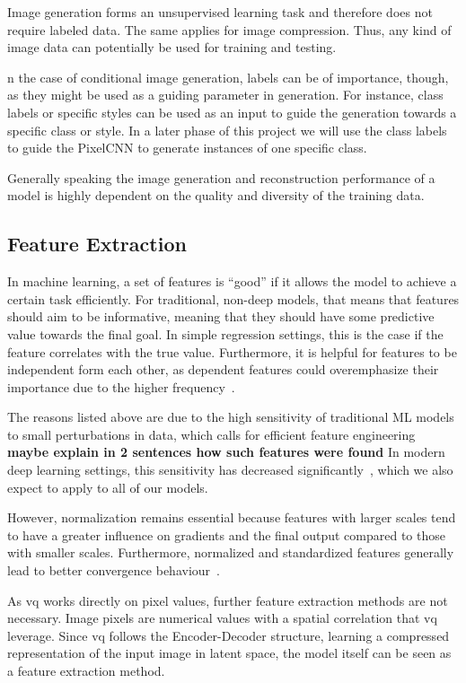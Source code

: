 Image generation forms an unsupervised learning task and therefore does not require labeled data.
The same applies for image compression.
Thus, any kind of image data can potentially be used for training and testing.

n the case of conditional image generation, labels can be of importance, though, as they might be used as a guiding
parameter in generation.
For instance, class labels or specific styles  can be used as an input to guide the generation towards a specific class or style.
In a later phase of this project we will use the class labels to guide the PixelCNN to generate instances of one specific class.

Generally speaking the image generation and reconstruction performance of a model is highly dependent on the quality
and diversity of the training data.

\subsection{Feature Extraction}\label{subsec:feature-extraction}
In machine learning, a set of features is ``good'' if it allows the model to achieve a certain task
efficiently.
For traditional, non-deep models, that means that features should aim to be informative, meaning that
they should have some predictive value towards the final goal.
In simple regression settings, this is the case if the feature correlates with the true value.
Furthermore, it is helpful for features to be independent form each other, as dependent features could overemphasize
their importance due to the higher frequency~\cite{featengineer}.

The reasons listed above are due to the high sensitivity of traditional ML models to small perturbations in data,
which calls for efficient feature engineering~\cite{lecun2015deep}
\textbf{maybe explain in 2 sentences how such features were found}
In modern deep learning settings, this sensitivity has decreased significantly~\cite{lecun2015deep}, which we also
expect to apply to all of our models.

However, normalization remains essential because features with larger scales tend to have a greater influence on gradients and
the final output compared to those with smaller scales.
Furthermore, normalized and standardized features generally lead to better convergence behaviour~\cite{mueller}.

As \ac{vq} works directly on pixel values, further feature extraction methods are not necessary.
Image pixels are numerical values with a spatial correlation that \ac{vq} leverage.
Since \ac{vq} follows the Encoder-Decoder structure, learning a compressed representation of the input image in latent
space, the model itself can be seen as a feature extraction method.

